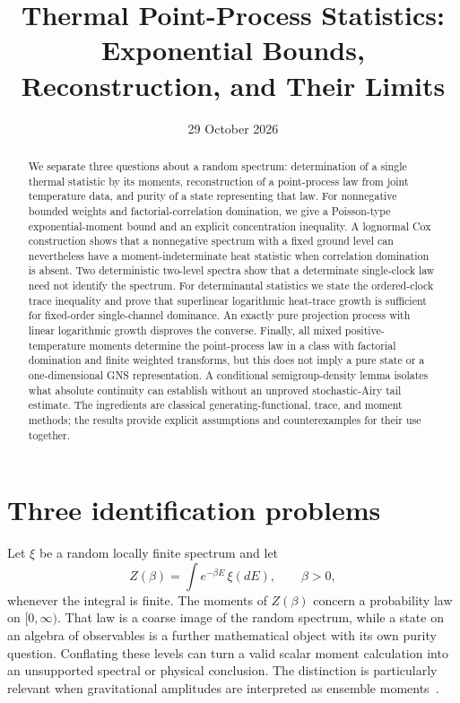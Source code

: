 \documentclass[11pt,a4paper]{article}
\title{Thermal Point-Process Statistics:\\Exponential Bounds, Reconstruction, and Their Limits}
\author{}
\date{29 October 2026}
\theoremstyle{remark}\newtheorem{remark}[theorem]{Remark}
\begin{document}
\maketitle
\begin{abstract}
We separate three questions about a random spectrum: determination of a single thermal statistic by its moments, reconstruction of a point-process law from joint temperature data, and purity of a state representing that law.
For nonnegative bounded weights and factorial-correlation domination, we give a Poisson-type exponential-moment bound and an explicit concentration inequality.
A lognormal Cox construction shows that a nonnegative spectrum with a fixed ground level can nevertheless have a moment-indeterminate heat statistic when correlation domination is absent.
Two deterministic two-level spectra show that a determinate single-clock law need not identify the spectrum.
For determinantal statistics we state the ordered-clock trace inequality and prove that superlinear logarithmic heat-trace growth is sufficient for fixed-order single-channel dominance.
An exactly pure projection process with linear logarithmic growth disproves the converse.
Finally, all mixed positive-temperature moments determine the point-process law in a class with factorial domination and finite weighted transforms, but this does not imply a pure state or a one-dimensional GNS representation.
A conditional semigroup-density lemma isolates what absolute continuity can establish without an unproved stochastic-Airy tail estimate.
The ingredients are classical generating-functional, trace, and moment methods; the results provide explicit assumptions and counterexamples for their use together.
\end{abstract}

\section{Three identification problems}
Let $\xi$ be a random locally finite spectrum and let
\begin{equation}\label{eq:heat}
 Z(\beta)=\int e^{-\beta E}\,\xi(dE),\qquad\beta>0,
\end{equation}
whenever the integral is finite.
The moments of $Z(\beta)$ concern a probability law on $[0,\infty)$.
That law is a coarse image of the random spectrum, while a state on an algebra of observables is a further mathematical object with its own purity question.
Conflating these levels can turn a valid scalar moment calculation into an unsupported spectral or physical conclusion.
The distinction is particularly relevant when gravitational amplitudes are interpreted as ensemble moments~\citep{JanssenMirbabayiZograf2021}.
\end{document}
